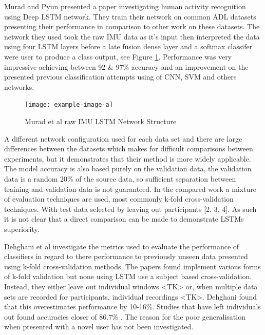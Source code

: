 \documentclass[sensors,article,submit,moreauthors,pdftex]{Definitions/mdpi}
\begin{document}
Murad and Pyun presented a paper investigating human activity recognition using Deep LSTM network\cite{Murad2017}. They train their network on common ADL datasets presenting their performance in comparison to other work on these datasets. The network they used took the raw IMU data as it's input then interpreted the data using four LSTM layers before a late fusion dense layer and a softmax classifer were user to produce a class output, see Figure \ref{fig:murad_lst_network_structure}. Performance was very impressive achieving between 92 \& 97\% accuracy and an improvement on the presented previous classification attempts using of CNN, SVM and others networks.

\begin{figure}[!htb]
    \centering
    \texttt{[image: example-image-a]}
    \caption{Murad et al raw IMU LSTM Network Structure}
    \label{fig:murad_lst_network_structure}
\end{figure}

A different network configuration used for each data set and there are large differences between the datasets which makes for difficult comparisons between experiments, but it demonstrates that their method is more widely applicable. The model accuracy is also based purely on the validation data, the validation data is a random 20\% of the source data, so sufficient separation between training and validation data is not guaranteed. In the compared work a mixture of evaluation techniques are used, most commonly k-fold cross-validation techniques. With test data selected by leaving out participants [2, 3, 4]. As such it is not clear that a direct comparison can be made to demonstrate LSTMs superiority.


Dehghani et al investigate the metrics used to evaluate the performance of classifiers in regard to there performance to previously unseen data presented using k-fold cross-validation methods\cite{Dehghani2019}. The papers found implement various forms of k-fold validation but none using LSTM use a subject based cross-validation. Instead, they either leave out individual windows \cite{Murad2017, Wang2020}<TK> or, when multiple data sets are recorded for participants, individual recordings \cite{Ordonez2016}<TK>. Dehghani found that this overestimates performance by 10-16\%. Studies that have left individuals out found accuracies closer of 86.7\% \cite{Zhao2018}. The reason for the poor generalisation when presented with a novel user has not been investigated.
\end{document}
